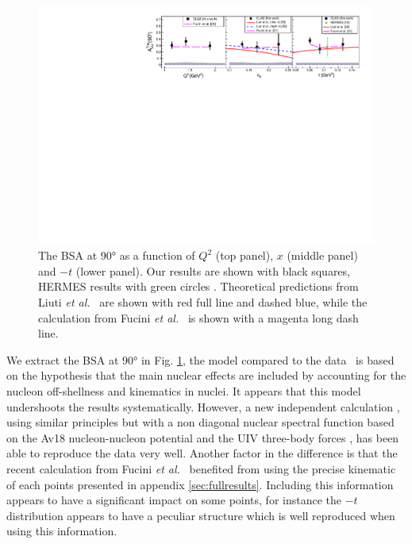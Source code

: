 \documentclass{article}
\begin{document}
\begin{figure}[tbp]
\center
\includegraphics[width=17cm]{fig3/Coherent_ALU_phi_90.pdf}
\caption{The BSA at 90° as a function of $Q^2$ (top panel), $x$ (middle panel) and $-t$ (lower panel).
	Our results are shown with black squares, HERMES results 
	with green circles \cite{Airapetian:2009cga}. Theoretical predictions 
	from Liuti {\it et al.}~\cite{Liuti:2005gi,GonzalezHernandez:2012jv} are shown 
	with red full line and dashed blue, while the calculation from Fucini 
	{\it et al.}~\cite{Fucini:2018gso} is shown with a magenta long dash line.}
\label{fig:CohALU90}
\end{figure}

We extract the BSA at 90° in Fig. \ref{fig:CohALU90}, the model compared to the 
data~\cite{Liuti:2005gi} is based on the hypothesis that the main nuclear effects are 
included by accounting for the nucleon off-shellness and kinematics in nuclei. It 
appears that this model undershoots the results systematically. However, a new independent 
calculation \cite{Fucini:2018gso}, using similar principles but with a non diagonal nuclear spectral 
function \cite{Viviani:2001wu} based on the Av18 nucleon-nucleon potential \cite{Wiringa:1994wb} 
and the UIV three-body forces \cite{Pudliner:1995wk}, has been able to reproduce the data very 
well. Another factor in the difference is that the recent calculation from Fucini {\it et 
al.}~\cite{Fucini:2018gso} benefited from using the precise kinematic of each points presented 
in appendix \ref{sec:fullresults}. Including this information appears to have a significant 
impact on some points, for instance the $-t$ distribution appears to have a peculiar structure 
which is well reproduced when using this information. 
\end{document}
